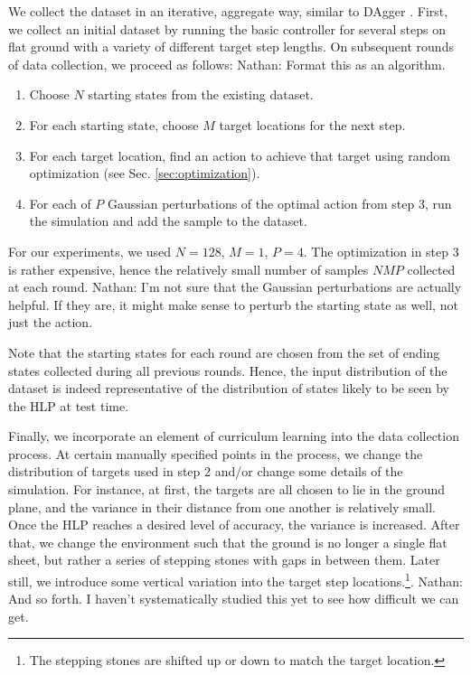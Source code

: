 \documentclass[a4paper]{article}
\newcommand{\nhatch}[1]{{\leavevmode\color{blue} Nathan: #1}}
\begin{document}
We collect the dataset in an iterative, aggregate way, similar to DAgger \citep{ross2011reduction}.
First, we collect an initial dataset by running the basic controller for several steps on flat ground with a variety of different target step lengths.
On subsequent rounds of data collection, we proceed as follows:
\nhatch{Format this as an algorithm.}
\begin{enumerate}
  \item Choose $N$ starting states from the existing dataset.
  \item For each starting state, choose $M$ target locations for the next step.
  \item For each target location, find an action to achieve that target using random optimization (see Sec. \ref{sec:optimization}).
  \item For each of $P$ Gaussian perturbations of the optimal action from step 3, run the simulation and add the sample to the dataset.
\end{enumerate}
For our experiments, we used $N=128$, $M=1$, $P=4$.
The optimization in step 3 is rather expensive, hence the relatively small number of samples $NMP$ collected at each round.
\nhatch{I'm not sure that the Gaussian perturbations are actually helpful. If they are, it might make sense to perturb the starting state as well, not just the action.}

Note that the starting states for each round are chosen from the set of ending states collected during all previous rounds.
Hence, the input distribution of the dataset is indeed representative of the distribution of states likely to be seen by the HLP at test time.

Finally, we incorporate an element of curriculum learning into the data collection process.
At certain manually specified points in the process, we change the distribution of targets used in step 2 and/or change some details of the simulation.
For instance, at first, the targets are all chosen to lie in the ground plane, and the variance in their distance from one another is relatively small.
Once the HLP reaches a desired level of accuracy, the variance is increased.
After that, we change the environment such that the ground is no longer a single flat sheet, but rather a series of stepping stones with gaps in between them.
Later still, we introduce some vertical variation into the target step locations.\footnote{The stepping stones are shifted up or down to match the target location.}.
\nhatch{And so forth. I haven't systematically studied this yet to see how difficult we can get.}
\end{document}

